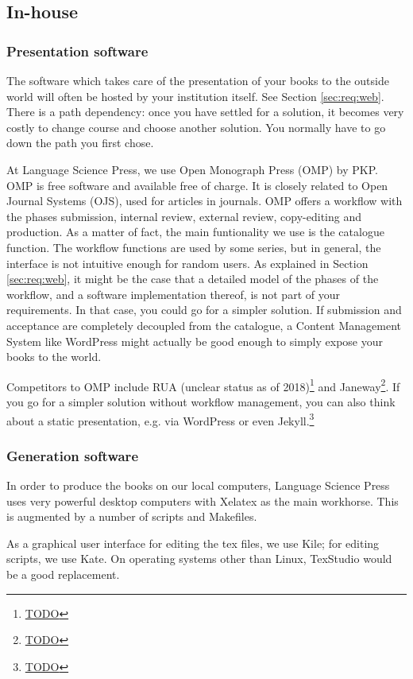\documentclass[guidelines,nonflat,modfonts] {langsci/langscibook}
\newcommand{\footurl}[1]{\footnote{\url{#1}}}
\begin{document}
\subsection{In-house}
\subsubsection{Presentation software}
The software which takes care of the presentation of your books to the outside world will often be hosted by your institution itself. See Section \ref{sec:req:web}. There is a path dependency: once you have settled for a solution, it becomes very costly to change course and choose another solution. You normally have to go down the path you first chose. 

At Language Science Press, we use Open Monograph Press (OMP) by PKP. OMP is free software and available free of charge. It is closely related to Open Journal Systems (OJS), used for articles in journals. OMP offers a workflow with the phases submission, internal review, external review, copy-editing and production. As a matter of fact, the main funtionality we use is the catalogue function. The workflow functions are used by some series, but in general, the interface is not intuitive enough for random users. As explained in Section \ref{sec:req:web}, it might be the case that a detailed model of the phases of the workflow, and a software implementation thereof, is not part of your requirements. In that case, you could go for a simpler solution. If submission and acceptance are completely decoupled from the catalogue, a Content Management System like WordPress might actually be good enough to simply expose your books to the world. 

Competitors to OMP include RUA (unclear status as of 2018)\footurl{TODO} and Janeway\footurl{TODO}. If you go for a simpler solution without workflow management, you can also think about a static presentation, e.g. via WordPress or even Jekyll.\footurl{TODO} 

\subsubsection{Generation software}
In order to produce the books on our local computers, Language Science Press uses very powerful desktop computers with Xelatex as the main workhorse. This is augmented by a number of scripts and Makefiles. 

As a graphical user interface for editing the tex files, we use Kile; for editing scripts, we use Kate. On operating systems other than Linux, TexStudio would be a good replacement. 
\end{document}
